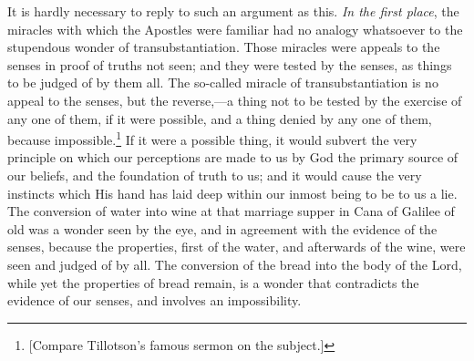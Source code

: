 \documentclass[
]{book}
\begin{document}
It is hardly necessary to reply to such an argument as this. \emph{In the first place}, the miracles with which the Apostles were familiar had no analogy whatsoever to the stupendous wonder of transubstantiation. Those miracles were appeals to the senses in proof of truths not seen; and they were tested by the senses, as things to be judged of by them all. The so-called miracle of transubstantiation is no appeal to the senses, but the reverse,---a thing not to be tested by the exercise of any one of them, if it were possible, and a thing denied by any one of them, because impossible.\footnote{{[}Compare Tillotson's famous sermon on the subject.{]}} If it were a possible thing, it would subvert the very principle on which our perceptions are made to us by God the primary source of our beliefs, and the foundation of truth to us; and it would cause the very instincts which His hand has laid deep within our inmost being to be to us a lie. The conversion of water into wine at that marriage supper in Cana of Galilee of old was a wonder seen by the eye, and in agreement with the evidence of the senses, because the properties, first of the water, and afterwards of the wine, were seen and judged of by all. The conversion of the bread into the body of the Lord, while yet the properties of bread remain, is a wonder that contradicts the evidence of our senses, and involves an impossibility.
\end{document}
